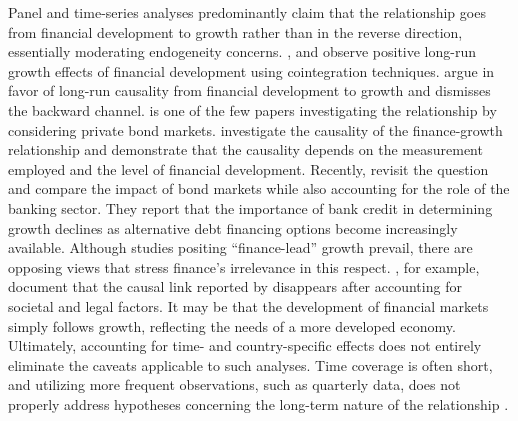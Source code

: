 \begin{refsection}
Panel and time-series analyses predominantly claim that the relationship goes from financial development to growth rather than in the reverse direction, essentially moderating endogeneity concerns.  \textcite{ChristopoulosTsionas2004}, \textcite{Finketal2003} and \textcite{PeiaRoszbach2015} observe positive long-run growth effects of financial development using cointegration techniques. \textcite{ChristopoulosTsionas2004} argue in favor of long-run causality from financial development to growth and dismisses the backward channel. \textcite{Finketal2003} is one of the few papers investigating the relationship by considering private bond markets. \textcite{PeiaRoszbach2015} investigate the causality of the finance-growth relationship and demonstrate that the causality depends on the measurement employed and the level of financial development. Recently, \textcite{Thumrongvitetal2013} revisit the question and compare the impact of bond markets while also accounting for the role of the banking sector. They report that the importance of bank credit in determining growth declines as alternative debt financing options become increasingly available. Although studies positing ``finance-lead'' growth prevail, there are opposing views that stress finance's irrelevance in this respect. \textcite{Garretsenetal2004}, for example, document that the causal link reported by \textcite{RajanZingales1998} disappears after accounting for societal and legal factors. It may be that the development of financial markets simply follows growth, reflecting the needs of a more developed economy. Ultimately, accounting for time- and country-specific effects does not entirely eliminate the caveats applicable to such analyses. Time coverage is often short, and utilizing more frequent observations, such as quarterly data, does not properly address hypotheses concerning the long-term nature of the relationship \parencite{Ang2008}. 


\end{refsection}
